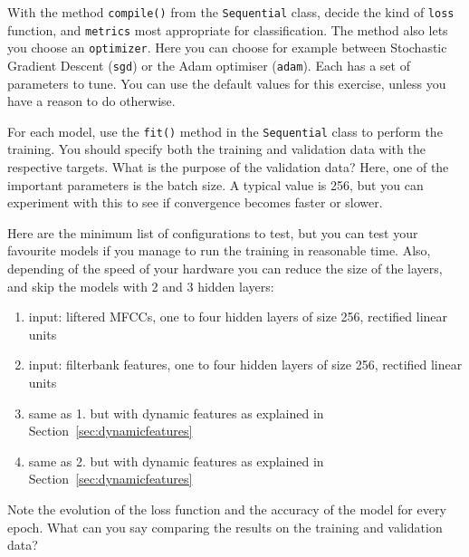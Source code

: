 \documentclass{nada-ten}
\begin{document}
With the method \texttt{compile()} from the \texttt{Sequential} class, decide the kind of \texttt{loss} function, and \texttt{metrics} most appropriate for classification. The method also lets you choose an \texttt{optimizer}. Here you can choose for example between Stochastic Gradient Descent (\texttt{sgd}) or the Adam optimiser (\texttt{adam}). Each has a set of parameters to tune. You can use the default values for this exercise, unless you have a reason to do otherwise.

For each model, use the \texttt{fit()} method in the \texttt{Sequential} class to perform the training. You should specify both the training and validation data with the respective targets. What is the purpose of the validation data? Here, one of the important parameters is the batch size. A typical value is 256, but you can experiment with this to see if convergence becomes faster or slower.

Here are the minimum list of configurations to test, but you can test your favourite models if you manage to run the training in reasonable time. Also, depending of the speed of your hardware you can reduce the size of the layers, and skip the models with 2 and 3 hidden layers:
\begin{enumerate}
\item input: liftered MFCCs, one to four hidden layers of size 256, rectified linear units
\item input: filterbank features, one to four hidden layers of size 256, rectified linear units
\item same as 1. but with dynamic features as explained in Section~\ref{sec:dynamicfeatures}
\item same as 2. but with dynamic features as explained in Section~\ref{sec:dynamicfeatures}
\end{enumerate}
Note the evolution of the loss function and the accuracy of the model for every epoch. What can you say comparing the results on the training and validation data?
\end{document}
